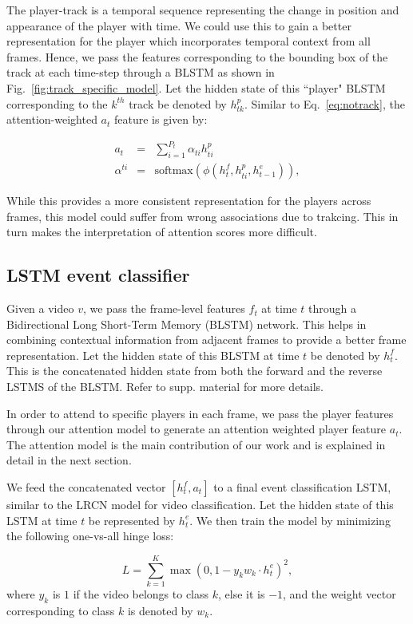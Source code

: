 {The player-track is a temporal sequence representing the change in position and
appearance of the player with time.  We could use this to gain a better
representation for the player which incorporates temporal context from all
frames. Hence, we pass the features corresponding to the bounding box of the
track at each time-step through a BLSTM as shown in
Fig.~\ref{fig:track_specific_model}. Let the hidden state of this ``player"
BLSTM corresponding to the $k^{th}$ track be denoted by $h^p_{tk}$. Similar to
Eq.~\ref{eq:notrack}, the attention-weighted $a_t$ feature is given by:

\begin{eqnarray}
  a_t & = & \sum_{i=1}^{P_t} \alpha_{ti} h^p_{ti} \\ \nonumber
  \alpha^{ti} & = & \text{softmax} \left(\phi\left(h^f_t, h^p_{ti}, h^e_{t-1}\right)\right),
\end{eqnarray}

While this provides a more consistent representation for the players across frames,
this model could suffer from wrong associations due to trakcing. This in turn makes
the interpretation of attention scores more difficult.


\subsection{LSTM event classifier}
Given a video $v$, we pass the frame-level features $f_t$ at time $t$ through a
Bidirectional Long Short-Term Memory (BLSTM) network. This helps in combining
contextual information from adjacent frames to provide a better frame
representation.  Let the hidden state of this BLSTM at time $t$ be denoted by
$h^f_t$.  This is the concatenated hidden state from both the forward and the
reverse LSTMS of the BLSTM. Refer to supp.  material for more details.

In order to attend to specific players in each frame, we pass the player features
through our attention model to generate an attention weighted player feature
$a_t$. The attention model is the main contribution of our work
and is explained in detail in the next section.

We feed the concatenated vector $[h^f_t, a_t]$ to a final event classification
LSTM, similar to the LRCN \cite{} model for video classification. Let
the hidden state of this LSTM at time $t$ be represented by $h^e_t$.  We then
train the model by minimizing the following one-vs-all hinge loss:

\begin{equation}
  L = \sum_{k = 1}^K \max (0, 1 - y_k w_k \cdot h^e_t)^2,
\end{equation} where $y_k$ is $1$ if the video belongs to class $k$,
else it is $-1$, and the weight vector corresponding to
class $k$ is denoted by $w_k$.
}
